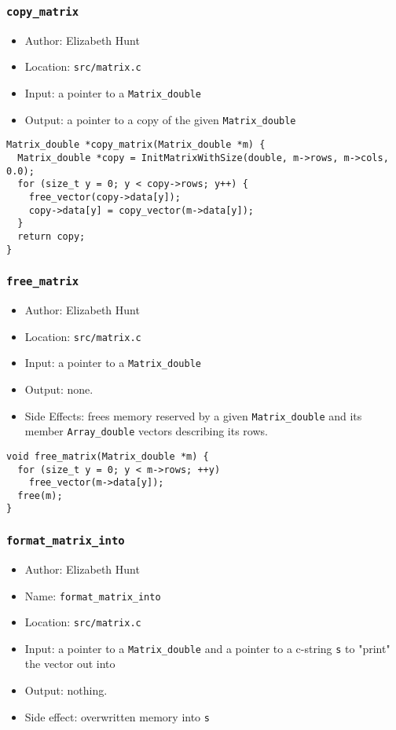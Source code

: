 \documentclass[11pt]{article}
\begin{document}
\subsubsection{\texttt{copy\_matrix}}
\label{sec:orge8936ce}
\begin{itemize}
\item Author: Elizabeth Hunt
\item Location: \texttt{src/matrix.c}
\item Input: a pointer to a \texttt{Matrix\_double}
\item Output: a pointer to a copy of the given \texttt{Matrix\_double}
\end{itemize}

\begin{verbatim}
Matrix_double *copy_matrix(Matrix_double *m) {
  Matrix_double *copy = InitMatrixWithSize(double, m->rows, m->cols, 0.0);
  for (size_t y = 0; y < copy->rows; y++) {
    free_vector(copy->data[y]);
    copy->data[y] = copy_vector(m->data[y]);
  }
  return copy;
}
\end{verbatim}

\subsubsection{\texttt{free\_matrix}}
\label{sec:orgf7b674e}
\begin{itemize}
\item Author: Elizabeth Hunt
\item Location: \texttt{src/matrix.c}
\item Input: a pointer to a \texttt{Matrix\_double}
\item Output: none.
\item Side Effects: frees memory reserved by a given \texttt{Matrix\_double} and its member
\texttt{Array\_double} vectors describing its rows.
\end{itemize}

\begin{verbatim}
void free_matrix(Matrix_double *m) {
  for (size_t y = 0; y < m->rows; ++y)
    free_vector(m->data[y]);
  free(m);
}
\end{verbatim}

\subsubsection{\texttt{format\_matrix\_into}}
\label{sec:org22902bd}
\begin{itemize}
\item Author: Elizabeth Hunt
\item Name: \texttt{format\_matrix\_into}
\item Location: \texttt{src/matrix.c}
\item Input: a pointer to a \texttt{Matrix\_double} and a pointer to a c-string \texttt{s} to "print" the vector out
into
\item Output: nothing.
\item Side effect: overwritten memory into \texttt{s}
\end{itemize}
\end{document}
